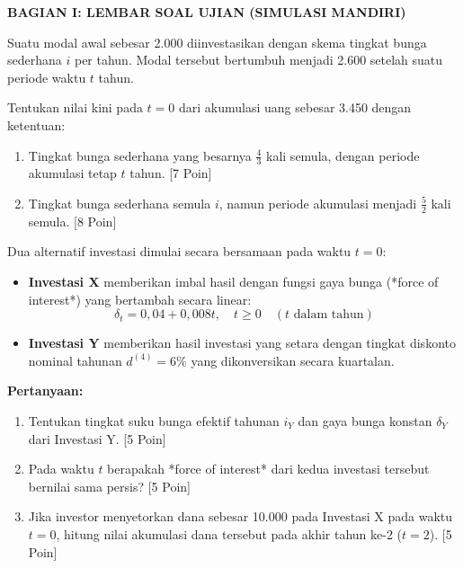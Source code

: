 \documentclass[11pt,a4paper]{article}
\begin{document}
\vspace{2mm}
\begin{center}
    {\fontsize{12}{14}\selectfont\bfseries\color{primaryblue} BAGIAN I: LEMBAR SOAL UJIAN (SIMULASI MANDIRI)}
\end{center}
\vspace{1mm}

\begin{naskahsoalbox}
Suatu modal awal sebesar 2.000 diinvestasikan dengan skema tingkat bunga sederhana $i$ per tahun. Modal tersebut bertumbuh menjadi 2.600 setelah suatu periode waktu $t$ tahun.

Tentukan nilai kini pada $t=0$ dari akumulasi uang sebesar 3.450 dengan ketentuan:
\begin{enumerate}[label=(\alph*), topsep=2pt, itemsep=2pt]
    \item Tingkat bunga sederhana yang besarnya $\frac{4}{3}$ kali semula, dengan periode akumulasi tetap $t$ tahun. \hfill [7 Poin]
    \item Tingkat bunga sederhana semula $i$, namun periode akumulasi menjadi $\frac{5}{2}$ kali semula. \hfill [8 Poin]
\end{enumerate}
\end{naskahsoalbox}

\begin{naskahsoalbox}
Dua alternatif investasi dimulai secara bersamaan pada waktu $t = 0$:
\begin{itemize}[leftmargin=4mm, topsep=1pt, itemsep=1pt]
    \item \textbf{Investasi X} memberikan imbal hasil dengan fungsi gaya bunga (*force of interest*) yang bertambah secara linear:
    $$\delta_t = 0{,}04 + 0{,}008t, \quad t \ge 0 \quad (t \text{ dalam tahun})$$
    \item \textbf{Investasi Y} memberikan hasil investasi yang setara dengan tingkat diskonto nominal tahunan $d^{(4)} = 6\%$ yang dikonversikan secara kuartalan.
\end{itemize}
\textbf{Pertanyaan:}
\begin{enumerate}[label=(\alph*), topsep=2pt, itemsep=2pt]
    \item Tentukan tingkat suku bunga efektif tahunan $i_Y$ dan gaya bunga konstan $\delta_Y$ dari Investasi Y. \hfill [5 Poin]
    \item Pada waktu $t$ berapakah *force of interest* dari kedua investasi tersebut bernilai sama persis? \hfill [5 Poin]
    \item Jika investor menyetorkan dana sebesar 10.000 pada Investasi X pada waktu $t=0$, hitung nilai akumulasi dana tersebut pada akhir tahun ke-2 ($t=2$). \hfill [5 Poin]
\end{enumerate}
\end{naskahsoalbox}
\end{document}
